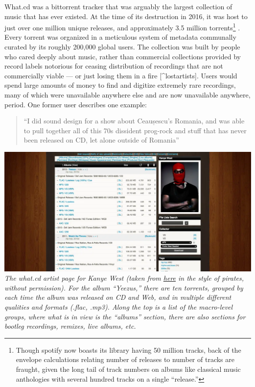 \documentclass[notoc]{tufte-book}
\begin{document}
What.cd was a bittorrent tracker that was arguably the largest
collection of music that has ever existed. At the time of its
destruction in 2016, it was host to just over one million unique
releases, and approximately 3.5 million torrents\footnote{Though spotify
  now boasts its library having 50 million tracks, back of the envelope
  calculations relating number of releases to number of tracks are
  fraught, given the long tail of track numbers on albums like classical
  music anthologies with several hundred tracks on a single ``release.''}
\citep{dunhamWhatCDLegacy2018} . Every torrent was organized in a
meticulous system of metadata communally curated by its roughly 200,000
global users. The collection was built by people who cared deeply about
music, rather than commercial collections provided by record labels
notorious for ceasing distribution of recordings that are not
commercially viable --- or just losing them in a fire \citep{rosenDayMusicBurned2019} {[}\^{}lostartists{]}. Users would spend
large amounts of money to find and digitize extremely rare recordings,
many of which were unavailable anywhere else and are now unavailable
anywhere, period. One former user describes one example:

\begin{quote}
``I did sound design for a show about Ceaușescu's Romania, and was able
to pull together all of this 70s dissident prog-rock and stuff that has
never been released on CD, let alone outside of Romania'' \citep{sonnadEulogyWhatCd2016} 
\end{quote}

\includegraphics[width=\linewidth]{../assets/images/kanye-what.png} \emph{The
what.cd artist page for Kanye West (taken from
\href{https://qz.com/840661/what-cd-is-gone-a-eulogy-for-the-greatest-music-collection-in-the-world/}{here}
in the style of pirates, without permission). For the album ``Yeezus,''
there are ten torrents, grouped by each time the album was released on
CD and Web, and in multiple different qualities and formats (.flac,
.mp3). Along the top is a list of the macro-level groups, where what is
in view is the ``albums'' section, there are also sections for bootleg
recordings, remixes, live albums, etc.}
\end{document}

